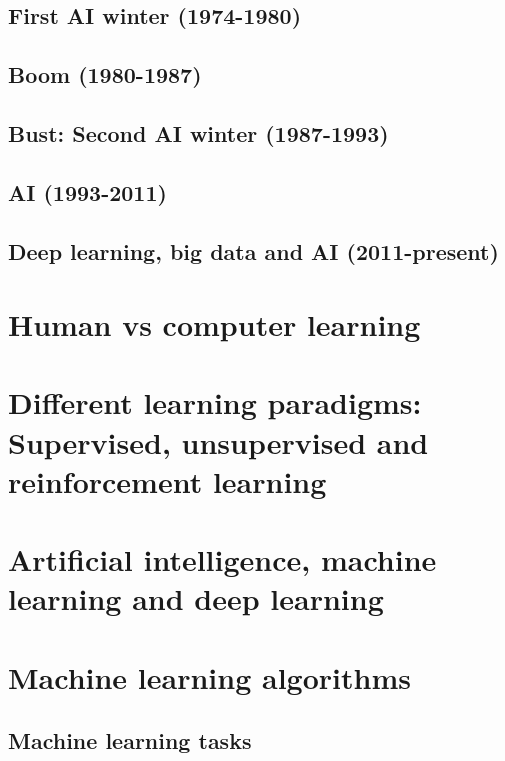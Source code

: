 \subsection{First AI winter (1974-1980)}
\subsection{Boom (1980-1987)}
\subsection{Bust: Second AI winter (1987-1993)}
\subsection{AI (1993-2011)}
\subsection{Deep learning, big data and AI (2011-present)}


%
%
%






\section{Human vs computer learning}


\section{Different learning paradigms: Supervised, unsupervised and reinforcement learning}

\section{Artificial intelligence, machine learning and deep learning}

\section{Machine learning algorithms}


\subsection{Machine learning tasks}

